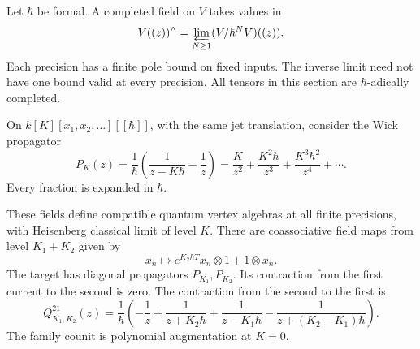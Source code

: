 Let $\hbar$ be formal. A completed field on $V$ takes values in
\[
 V((z))^\wedge=\varprojlim_{N\geq1}(V/\hbar^NV)((z)).
\]
Each precision has a finite pole bound on fixed inputs.
The inverse limit need not have one bound valid at every precision.
All tensors in this section are $\hbar$-adically completed.

On $k[K][x_1,x_2,\ldots][[\hbar]]$, with the same jet translation,
consider the Wick propagator
\begin{equation}\label{cylev:eq:formal-propagator}
 P_K(z)=\frac1\hbar\left(\frac1{z-K\hbar}-\frac1z\right)
       =\frac K{z^2}+\frac{K^2\hbar}{z^3}
          +\frac{K^3\hbar^2}{z^4}+\cdots.
\end{equation}
Every fraction is expanded in $\hbar$.

\begin{proposition}\label{cylev:prop:formal}
These fields define compatible quantum vertex algebras at all finite
precisions, with Heisenberg classical limit of level $K$.
There are coassociative field maps from level $K_1+K_2$ given by
\begin{equation}\label{cylev:eq:formal-coproduct}
 x_n\longmapsto e^{K_2\hbar T}x_n\otimes1+1\otimes x_n.
\end{equation}
The target has diagonal propagators $P_{K_1},P_{K_2}$.
Its contraction from the first current to the second is zero.
The contraction from the second to the first is
\begin{equation}\label{cylev:eq:formal-cross}
 Q_{K_1,K_2}^{21}(z)=\frac1\hbar
 \left(-\frac1z+\frac1{z+K_2\hbar}+\frac1{z-K_1\hbar}
                 -\frac1{z+(K_2-K_1)\hbar}\right).
\end{equation}
The family counit is polynomial augmentation at $K=0$.
\end{proposition}
